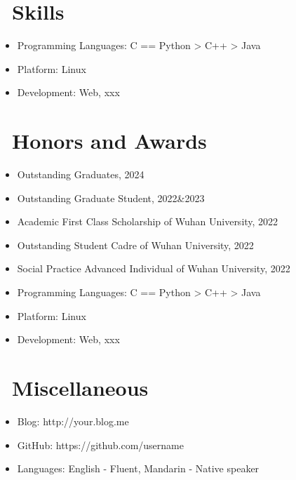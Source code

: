 \documentclass{resume}
\begin{document}

\section{\faCogs\ Skills}
\begin{itemize}[parsep=0.5ex]
  \item Programming Languages: C == Python > C++ > Java
  \item Platform: Linux
  \item Development: Web, xxx
\end{itemize}

\section{\faHeartO\ Honors and Awards}
\begin{itemize}[parsep=0.5ex]
  \item Outstanding Graduates, 2024
  \item Outstanding Graduate Student, 2022&2023
  \item Academic First Class Scholarship of Wuhan University, 2022
  \item Outstanding Student Cadre of Wuhan University, 2022
  \item Social Practice Advanced Individual of Wuhan University, 2022
  \item 
  Programming Languages: C == Python > C++ > Java
  \item Platform: Linux
  \item Development: Web, xxx
\end{itemize}



\section{\faInfo\ Miscellaneous}
\begin{itemize}[parsep=0.5ex]
  \item Blog: http://your.blog.me
  \item GitHub: https://github.com/username
  \item Languages: English - Fluent, Mandarin - Native speaker
\end{itemize}

%
%
\end{document}
